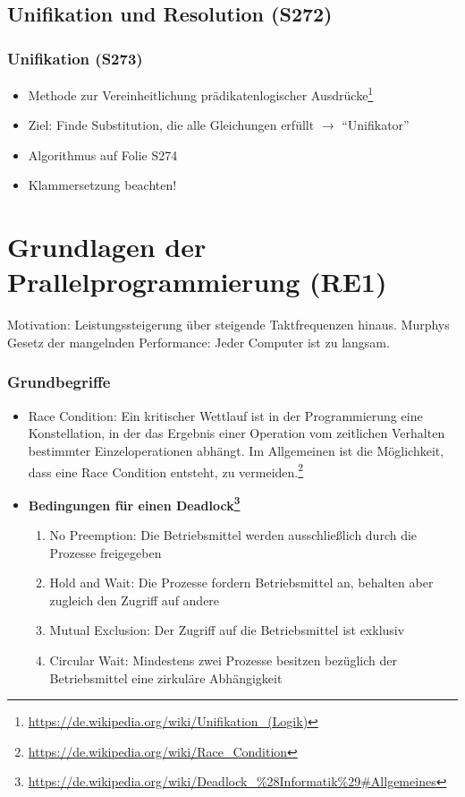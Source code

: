 \subsection{Unifikation und Resolution (S272)}

\subsubsection{Unifikation (S273)}
\begin{itemize}
	\item Methode zur Vereinheitlichung prädikatenlogischer Ausdrücke\footnote{\url{https://de.wikipedia.org/wiki/Unifikation_(Logik)}}
	\item Ziel: Finde Substitution, die alle Gleichungen erfüllt \(\rightarrow\) "`Unifikator"'
	\item Algorithmus auf Folie S274
	\item Klammersetzung beachten!
\end{itemize}



\section{Grundlagen der Prallelprogrammierung (RE1)}
Motivation: Leistungssteigerung über steigende Taktfrequenzen hinaus. Murphys Gesetz der mangelnden Performance: Jeder Computer ist zu langsam.

\subsubsection{Grundbegriffe}
\begin{itemize}
	\item Race Condition: Ein kritischer Wettlauf ist in der Programmierung eine Konstellation, in der das Ergebnis einer Operation vom zeitlichen Verhalten bestimmter Einzeloperationen abhängt. Im Allgemeinen ist die Möglichkeit, dass eine Race Condition entsteht, zu vermeiden.\footnote{\url{https://de.wikipedia.org/wiki/Race_Condition}}
	\item \textbf{Bedingungen für einen Deadlock\footnote{\url{https://de.wikipedia.org/wiki/Deadlock_\%28Informatik\%29\#Allgemeines}}}
	\begin{enumerate}
		\item No Preemption: Die Betriebsmittel werden ausschließlich durch die Prozesse freigegeben
		\item Hold and Wait: Die Prozesse fordern Betriebsmittel an, behalten aber zugleich den Zugriff auf andere
		\item Mutual Exclusion: Der Zugriff auf die Betriebsmittel ist exklusiv
		\item Circular Wait: Mindestens zwei Prozesse besitzen bezüglich der Betriebsmittel eine zirkuläre Abhängigkeit
	\end{enumerate}
\end{itemize}

